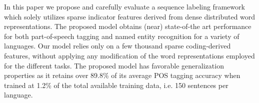 In this paper we propose and carefully evaluate a sequence labeling framework which solely utilizes sparse indicator features derived from dense distributed word representations. The proposed model obtains (near) state-of-the art performance for both part-of-speech tagging and named entity recognition for a variety of languages. Our model relies only on a few thousand sparse coding-derived features, without applying any modification of the word representations employed for the different tasks. The proposed model has favorable generalization properties as it retains over 89.8\% of its average POS tagging accuracy when trained at 1.2\% of the total available training data, i.e. 150 sentences per language.